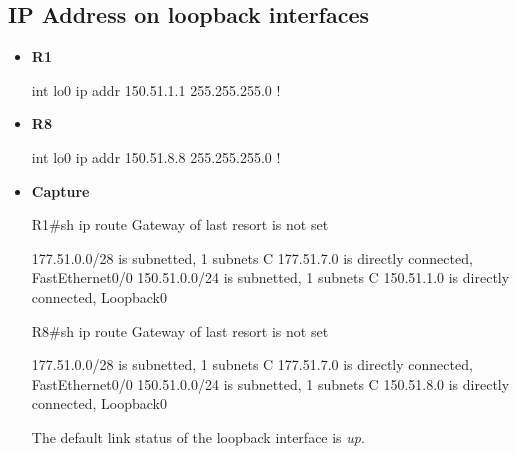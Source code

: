 \documentclass[10pt]{article}
\begin{document}
\subsection{IP Address on loopback interfaces}
\begin{itemize}
\item {\bf R1}
\begin{verbatim*}
int lo0
 ip addr 150.51.1.1 255.255.255.0
!
\end{verbatim*}
\item {\bf R8}
\begin{verbatim*}
int lo0
 ip addr 150.51.8.8 255.255.255.0
!
\end{verbatim*}
\item {\bf Capture}
\begin{verbatim*}
R1#sh ip route
Gateway of last resort is not set

177.51.0.0/28 is subnetted, 1 subnets
C       177.51.7.0 is directly connected, FastEthernet0/0
150.51.0.0/24 is subnetted, 1 subnets
C       150.51.1.0 is directly connected, Loopback0

R8#sh ip route
Gateway of last resort is not set

177.51.0.0/28 is subnetted, 1 subnets
C       177.51.7.0 is directly connected, FastEthernet0/0
150.51.0.0/24 is subnetted, 1 subnets
C       150.51.8.0 is directly connected, Loopback0
\end{verbatim*}
The default link status of the loopback interface is {\em up}.
\end{itemize}
\end{document}
